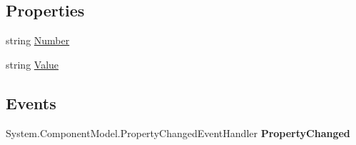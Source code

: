 \subsection*{Properties}
\begin{DoxyCompactItemize}
\item 
\hypertarget{class_price___comparison_1_1amazon_1_1ecs_1_1_tracks_disc_track_a2e089969a9b4a33a3a4211ef2027def4}{string \hyperlink{class_price___comparison_1_1amazon_1_1ecs_1_1_tracks_disc_track_a2e089969a9b4a33a3a4211ef2027def4}{Number}}\label{class_price___comparison_1_1amazon_1_1ecs_1_1_tracks_disc_track_a2e089969a9b4a33a3a4211ef2027def4}

\begin{DoxyCompactList}\small\item\em \end{DoxyCompactList}\item 
\hypertarget{class_price___comparison_1_1amazon_1_1ecs_1_1_tracks_disc_track_a01304e9dc6fdb13d8df7ac878dd3b2c2}{string \hyperlink{class_price___comparison_1_1amazon_1_1ecs_1_1_tracks_disc_track_a01304e9dc6fdb13d8df7ac878dd3b2c2}{Value}}\label{class_price___comparison_1_1amazon_1_1ecs_1_1_tracks_disc_track_a01304e9dc6fdb13d8df7ac878dd3b2c2}

\begin{DoxyCompactList}\small\item\em \end{DoxyCompactList}\end{DoxyCompactItemize}
\subsection*{Events}
\begin{DoxyCompactItemize}
\item 
\hypertarget{class_price___comparison_1_1amazon_1_1ecs_1_1_tracks_disc_track_a0641adc8fc0ea5788e4fcc22e1524086}{System.\-Component\-Model.\-Property\-Changed\-Event\-Handler {\bfseries Property\-Changed}}\label{class_price___comparison_1_1amazon_1_1ecs_1_1_tracks_disc_track_a0641adc8fc0ea5788e4fcc22e1524086}

\end{DoxyCompactItemize}
